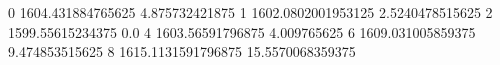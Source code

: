 0 1604.431884765625 4.875732421875
1 1602.0802001953125 2.5240478515625
2 1599.55615234375 0.0
4 1603.56591796875 4.009765625
6 1609.031005859375 9.474853515625
8 1615.1131591796875 15.5570068359375
